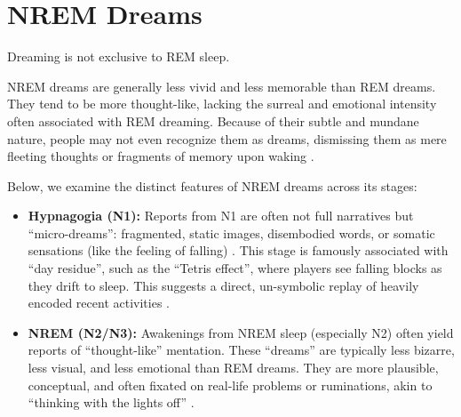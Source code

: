 \section{NREM Dreams}\label{sec:nrem_dreams}

Dreaming is not exclusive to REM sleep. 

NREM dreams are generally less vivid and less memorable than REM dreams. They tend to be more thought-like, lacking the surreal and emotional intensity often associated with REM dreaming. Because of their subtle and mundane nature, people may not even recognize them as dreams, dismissing them as mere fleeting thoughts or fragments of memory upon waking \citep{revonsuo2013important, nir_tononi2010}.

Below, we examine the distinct features of NREM dreams across its stages:

\begin{itemize}
    \item \textbf{Hypnagogia (N1):} Reports from N1 are often not full narratives but ``micro-dreams'': fragmented, static images, disembodied words, or somatic sensations (like the feeling of falling) \citep{revonsuo2013important}. This stage is famously associated with ``day residue'', such as the ``Tetris effect'', where players see falling blocks as they drift to sleep. This suggests a direct, un-symbolic replay of heavily encoded recent activities \citep{stickgold2000tetris}.
    \item \textbf{NREM (N2/N3):} Awakenings from NREM sleep (especially N2) often yield reports of ``thought-like'' mentation. These ``dreams'' are typically less bizarre, less visual, and less emotional than REM dreams. They are more plausible, conceptual, and often fixated on real-life problems or ruminations, akin to ``thinking with the lights off'' \citep{revonsuo2013important}.
\end{itemize}